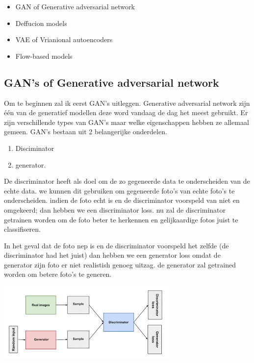 \documentclass[12pt]{article}
\begin{document}
\begin{itemize}
    \item GAN of Generative adversarial network
    \item Deffucion models
    \item VAE of Vrianional autoencoders
    \item Flow-based models
\end{itemize}

\subsection{GAN's of Generative adversarial network}

Om te beginnen zal ik eerst GAN’s uitleggen. Generative adversarial network zijn één van de generatief modellen
deze word vandaag de dag het meest gebruikt. Er zijn verschillende types van GAN's maar welke eigenschappen
hebben ze allemaal gemeen. GAN’s bestaan uit 2 belangerijke onderdelen.
\begin{enumerate}	
    \item Disciminator
    \item generator.
\end{enumerate}

De discriminator heeft als doel om de zo gegeneerde data te onderscheiden van de echte data. we kunnen dit gebruiken om gegeneerde foto's van echte foto's te onderscheiden.
indien de foto echt is en de discriminator voorspeld van niet en omgekeerd; dan hebben we een discriminator loss. 
nu zal de discriminator getrainen worden om de foto beter te herkennen en gelijkaardige fotos juist te classifiseren.

\bigskip
In het geval dat de foto nep is en de discriminator voorspeld het zelfde (de discriminator had het juist)
dan hebben we een generator loss omdat de generator zijn foto er niet realistish genoeg uitzag.
 de generator zal getrained worden om betere foto's te generen. 

\begin{center}
    \includegraphics[width=0.6\columnwidth, ]{GAN.png}
\end{center}
\end{document}
